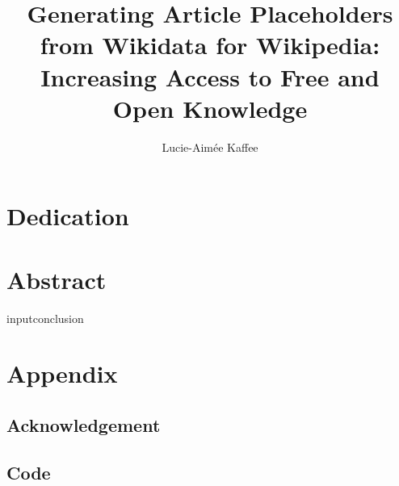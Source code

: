 \documentclass[11pt]{report}
\title{Generating Article Placeholders from Wikidata for Wikipedia:\\Increasing Access to Free and Open Knowledge}
\author{Lucie-Aim\'{e}e Kaffee}
\date{}
\begin{document}
\maketitle
\newpage

\chapter*{Dedication}

\chapter*{Abstract}
\newpage

\tableofcontents




\newpage

\newpage

input{conclusion}
\chapter{Appendix}
	\section{Acknowledgement}
	
	\section{Code}



\end{document}
